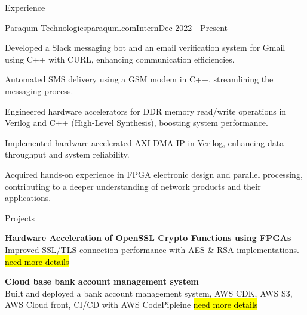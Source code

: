 \documentclass[
	11pt, %
]{./assets/resume} %
\begin{document}
\begin{rSection}{Experience}
	\begin{rSubsectionX}{Paraqum Technologies}{paraqum.com}{Intern}{Dec 2022 - Present}
		\item Developed a Slack messaging bot and an email verification system for Gmail using C++ with CURL, enhancing communication efficiencies.
		\item Automated SMS delivery using a GSM modem in C++, streamlining the messaging process.
		\item Engineered hardware accelerators for DDR memory read/write operations in Verilog and C++ (High-Level Synthesis), boosting system performance.
		\item Implemented hardware-accelerated AXI DMA IP in Verilog, enhancing data throughput and system reliability.
		\item Acquired hands-on experience in FPGA electronic design and parallel processing, contributing to a deeper understanding of network products and their applications.
	\end{rSubsectionX}

\end{rSection}


\begin{rSection}{Projects}

	\textbf{Hardware Acceleration of OpenSSL Crypto Functions using FPGAs} \\
	Improved SSL/TLS connection performance with AES \& RSA implementations.
	\hl {need more details}

	\textbf{Cloud base bank account management system} \\
	Built and deployed a bank account management system, AWS CDK, AWS S3, AWS Cloud front, CI/CD with AWS CodePipleine
	\hl {need more details}

\end{rSection}




\end{document}
